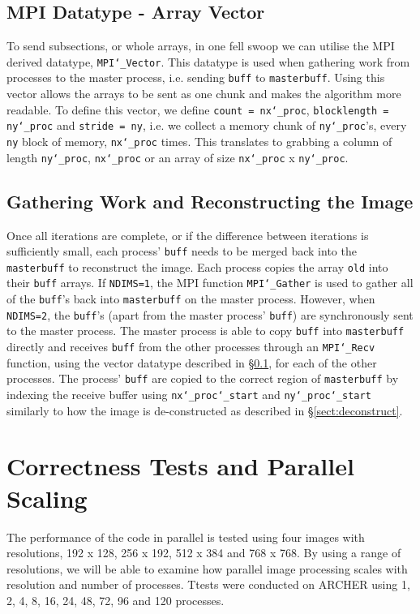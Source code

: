 \documentclass[11pt, a4paper]{article}
\begin{document}
		\subsection{MPI Datatype - Array Vector} \label{sect:array_vector}
			To send subsections, or whole arrays, in one fell swoop we can utilise the MPI derived datatype, \texttt{MPI\char`_Vector}. This datatype is used when gathering work from processes to the master process, i.e. sending \texttt{buff} to \texttt{masterbuff}. Using this vector allows the arrays to be sent as one chunk and makes the algorithm more readable. To define this vector, we define \texttt{count = nx\char`_proc}, \texttt{blocklength = ny\char`_proc} and \texttt{stride = ny}, i.e. we collect a memory chunk of \texttt{ny\char`_proc}'s, every \texttt{ny} block of memory, \texttt{nx\char`_proc} times. This translates to grabbing a column of length \texttt{ny\char`_proc}, \texttt{nx\char`_proc} or an array of size \texttt{nx\char`_proc} x \texttt{ny\char`_proc}.	
		
		\subsection{Gathering Work and Reconstructing the Image} \label{sect:reconstruct}
			Once all iterations are complete, or if the difference between iterations is sufficiently small, each process' \texttt{buff} needs to be merged back into the \texttt{masterbuff} to reconstruct the image. Each process copies the array \texttt{old} into their \texttt{buff} arrays. If \texttt{NDIMS=1}, the MPI function \texttt{MPI\char`_Gather} is used to gather all of the \texttt{buff}'s back into \texttt{masterbuff} on the master process. However, when \texttt{NDIMS=2}, the \texttt{buff}'s (apart from the master process' \texttt{buff}) are synchronously sent to the master process. The master process is able to copy \texttt{buff} into \texttt{masterbuff} directly and receives \texttt{buff} from the other processes through an \texttt{MPI\char`_Recv} function, using the vector datatype described in \S\ref{sect:array_vector}, for each of the other processes. The process' \texttt{buff} are copied to the correct region of \texttt{masterbuff} by indexing the receive buffer using \texttt{nx\char`_proc\char`_start} and \texttt{ny\char`_proc\char`_start} similarly to how the image is de-constructed as described in \S\ref{sect:deconstruct}.

	\section{Correctness Tests and Parallel Scaling}
		The performance of the code in parallel is tested using four images with resolutions, 192 x 128, 256 x 192, 512 x 384 and 768 x 768. By using a range of resolutions, we will be able to examine how parallel image processing scales with resolution and number of processes. Ttests were conducted on ARCHER using 1, 2, 4, 8, 16, 24, 48, 72, 96 and 120 processes. 
\end{document}
